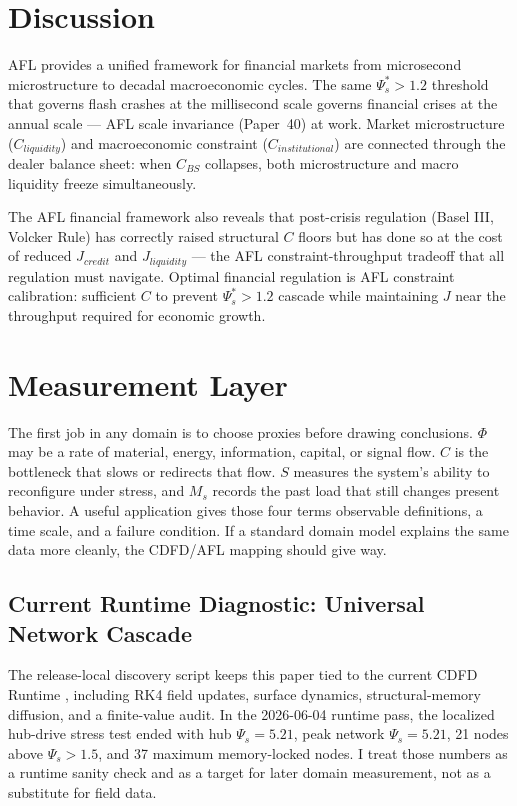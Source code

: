 \documentclass[11pt]{article}
\begin{document}
\section{Discussion}

AFL provides a unified framework for financial markets from microsecond microstructure to decadal
macroeconomic cycles. The same $\Psi_s^* > 1.2$ threshold that governs flash crashes at the
millisecond scale governs financial crises at the annual scale --- AFL scale invariance
(Paper~40) at work. Market microstructure ($C_{liquidity}$) and macroeconomic constraint
($C_{institutional}$) are connected through the dealer balance sheet: when $C_{BS}$ collapses,
both microstructure and macro liquidity freeze simultaneously.

The AFL financial framework also reveals that post-crisis regulation (Basel III, Volcker Rule)
has correctly raised structural $C$ floors but has done so at the cost of reduced $J_{credit}$
and $J_{liquidity}$ --- the AFL constraint-throughput tradeoff that all regulation must navigate.
Optimal financial regulation is AFL constraint calibration: sufficient $C$ to prevent $\Psi_s^* >
1.2$ cascade while maintaining $J$ near the throughput required for economic growth.



\section{Measurement Layer}

The first job in any domain is to choose proxies before drawing conclusions. $\Phi$ may be a rate of material, energy, information, capital, or signal flow. $C$ is the bottleneck that slows or redirects that flow. $S$ measures the system's ability to reconfigure under stress, and $M_s$ records the past load that still changes present behavior. A useful application gives those four terms observable definitions, a time scale, and a failure condition. If a standard domain model explains the same data more cleanly, the CDFD/AFL mapping should give way.

\subsection{Current Runtime Diagnostic: Universal Network Cascade}
The release-local discovery script keeps this paper tied to the current CDFD Runtime \cite{CDFDRuntime2026}, including RK4 field updates, surface dynamics, structural-memory diffusion, and a finite-value audit. In the 2026-06-04 runtime pass, the localized hub-drive stress test ended with hub $\Psi_s=5.21$, peak network $\Psi_s=5.21$, 21 nodes above $\Psi_s>1.5$, and 37 maximum memory-locked nodes. I treat those numbers as a runtime sanity check and as a target for later domain measurement, not as a substitute for field data.
\end{document}
